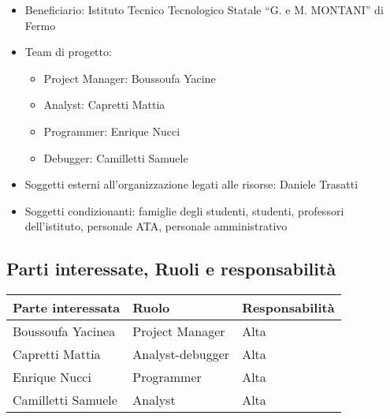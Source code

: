\documentclass{article}
\begin{document}
\begin{flushleft}
\begin{itemize}
			\item Beneficiario: Istituto Tecnico Tecnologico Statale “G. e M. MONTANI” di Fermo

			\item Team di progetto:

			\begin{itemize}

				\item Project Manager: Boussoufa Yacine

				\item Analyst: Capretti Mattia

				\item Programmer: Enrique Nucci

				\item Debugger: Camilletti Samuele

			\end{itemize}

			\item Soggetti esterni all'organizzazione legati alle risorse: Daniele Trasatti

			\item Soggetti condizionanti: famiglie degli studenti, studenti, professori dell'istituto, personale ATA, personale amministrativo

		\end{itemize}

		\subsection{Parti interessate, Ruoli e responsabilità}

		\begin{tabular}{ |p{4cm}|p{4cm}|p{4cm}|  }

			\hline

			Parte interessata&Ruolo &Responsabilità\\

			\hline

			Boussoufa Yacinea&Project Manager&Alta\\

			\hline

			Capretti Mattia&Analyst-debugger&Alta\\

			\hline

			Enrique Nucci&Programmer&Alta\\

			\hline

			Camilletti Samuele&Analyst&Alta\\


\end{tabular}
\end{flushleft}
\end{document}
